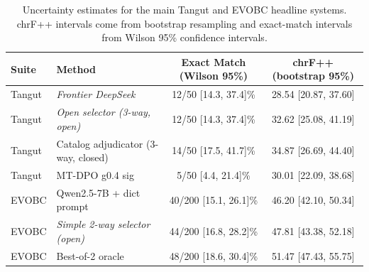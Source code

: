 \begin{table}[t]
\centering
\small
\begin{tabular}{llcc}
\toprule
Suite & Method & Exact Match (Wilson 95\%) & chrF++ (bootstrap 95\%) \\
\midrule
Tangut & \textit{Frontier DeepSeek} & 12/50 [14.3, 37.4]\% & 28.54 [20.87, 37.60] \\
Tangut & \textit{Open selector (3-way, open)} & 12/50 [14.3, 37.4]\% & 32.62 [25.08, 41.19] \\
Tangut & Catalog adjudicator (3-way, closed) & 14/50 [17.5, 41.7]\% & 34.87 [26.69, 44.40] \\
Tangut & MT-DPO g0.4 sig & 5/50 [4.4, 21.4]\% & 30.01 [22.09, 38.68] \\
\midrule
EVOBC & Qwen2.5-7B + dict prompt & 40/200 [15.1, 26.1]\% & 46.20 [42.10, 50.34] \\
EVOBC & \textit{Simple 2-way selector (open)} & 44/200 [16.8, 28.2]\% & 47.81 [43.38, 52.18] \\
EVOBC & Best-of-2 oracle & 48/200 [18.6, 30.4]\% & 51.47 [47.43, 55.75] \\
\bottomrule
\end{tabular}
\caption{Uncertainty estimates for the main Tangut and EVOBC headline systems. chrF++ intervals come from bootstrap resampling and exact-match intervals from Wilson 95\% confidence intervals.}
\label{tab:uncertainty-intervals}
\end{table}
